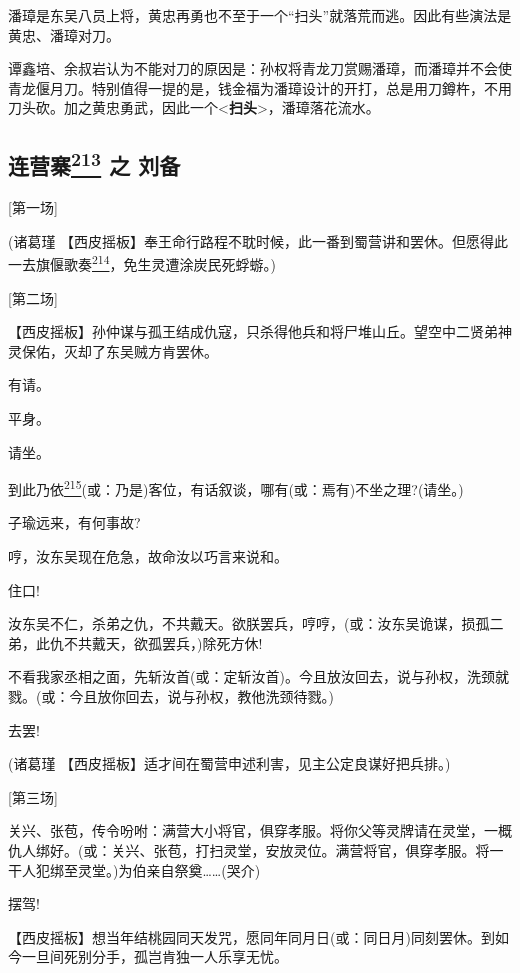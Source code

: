 潘璋是东吴八员上将，黄忠再勇也不至于一个``扫头''就落荒而逃。因此有些演法是黄忠、潘璋对刀。

谭鑫培、余叔岩认为不能对刀的原因是：孙权将青龙刀赏赐潘璋，而潘璋并不会使青龙偃月刀。特别值得一提的是，钱金福为潘璋设计的开打，总是用刀鐏杵，不用刀头砍。加之黄忠勇武，因此一个\textless{}\textbf{扫头}\textgreater{}，潘璋落花流水。

\newpage
\hypertarget{ux8fdeux8425ux5be8-ux4e4b-ux5218ux5907}{%
\subsection{\texorpdfstring{连营寨\protect\hyperlink{fn213}{\textsuperscript{213}}
之
刘备}{连营寨213 之 刘备}}\label{ux8fdeux8425ux5be8-ux4e4b-ux5218ux5907}}

{[}第一场{]}

(诸葛瑾
【西皮摇板】奉王命行路程不耽时候，此一番到蜀营讲和罢休。但愿得此一去旗偃歌奏\protect\hyperlink{fn214}{\textsuperscript{214}}，免生灵遭涂炭民死蜉蝣。)

{[}第二场{]}

【西皮摇板】孙仲谋与孤王结成仇寇，只杀得他兵和将尸堆山丘。望空中二贤弟神灵保佑，灭却了东吴贼方肯罢休。

有请。

平身。

请坐。

到此乃依\protect\hyperlink{fn215}{\textsuperscript{215}}(或：乃是)客位，有话叙谈，哪有(或：焉有)不坐之理?(请坐。)

子瑜远来，有何事故?

哼，汝东吴现在危急，故命汝以巧言来说和。

住口!

汝东吴不仁，杀弟之仇，不共戴天。欲朕罢兵，哼哼，(或：汝东吴诡谋，损孤二弟，此仇不共戴天，欲孤罢兵，)除死方休!

不看我家丞相之面，先斩汝首(或：定斩汝首)。今且放汝回去，说与孙权，洗颈就戮。(或：今且放你回去，说与孙权，教他洗颈待戮。)

去罢!

(诸葛瑾 【西皮摇板】适才间在蜀营申述利害，见主公定良谋好把兵排。)

{[}第三场{]}

关兴、张苞，传令吩咐：满营大小将官，俱穿孝服。将你父等灵牌请在灵堂，一概仇人绑好。(或：关兴、张苞，打扫灵堂，安放灵位。满营将官，俱穿孝服。将一干人犯绑至灵堂。)为伯亲自祭奠\ldots{}\ldots{}(哭介)

摆驾!

【西皮摇板】想当年结桃园同天发咒，愿同年同月日(或：同日月)同刻罢休。到如今一旦间死别分手，孤岂肯独一人乐享无忧。

